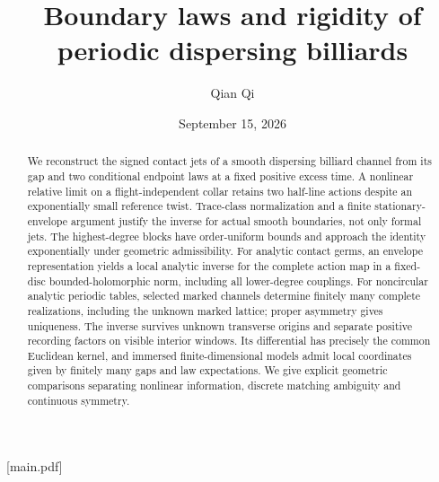 
[main.pdf]
\title[Boundary laws and periodic rigidity]{Boundary laws and rigidity of periodic dispersing billiards}
\author{Qian Qi}
\date{September 15, 2026}


\begin{abstract}
We reconstruct the signed contact jets of a smooth dispersing billiard
channel from its gap and two conditional endpoint laws at a fixed positive
excess time. A nonlinear relative limit on a flight-independent collar
retains two half-line actions despite an exponentially small reference
twist. Trace-class normalization and a finite stationary-envelope argument
justify the inverse for actual smooth boundaries, not only formal jets.
The highest-degree blocks have order-uniform bounds and approach the
identity exponentially under geometric admissibility.
For analytic contact germs, an envelope representation yields a local
analytic inverse for the complete action map in a fixed-disc
bounded-holomorphic norm, including all lower-degree couplings.
For noncircular analytic periodic tables, selected marked channels determine
finitely many complete realizations, including the unknown marked lattice;
proper asymmetry gives uniqueness. The inverse survives unknown transverse
origins and separate positive recording factors on visible interior windows.
Its differential has precisely the common Euclidean kernel, and immersed
finite-dimensional models admit local coordinates given by finitely many
gaps and law expectations. We give explicit geometric comparisons separating
nonlinear information, discrete matching ambiguity and continuous symmetry.
\end{abstract}
\maketitle
\enlargethispage{2pt}
\setcounter{tocdepth}{1}
\tableofcontents

